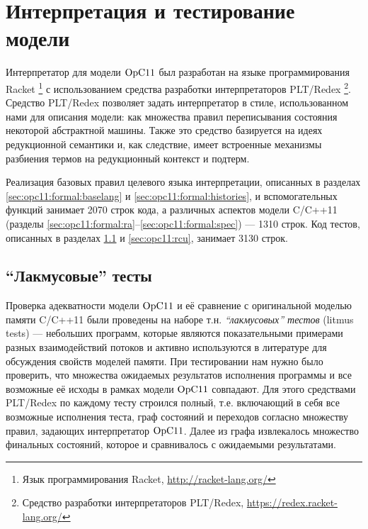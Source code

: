  
\section{Интерпретация и тестирование модели}
\label{sec:opc11:interpreter}

Интерпретатор для модели $\mathrm{OpC11}$ \cite{opCppCode} был разработан на языке программирования Racket%
\footnote{Язык программирования Racket, \url{http://racket-lang.org/}}
с использованием средства разработки интерпретаторов PLT/Redex%
\footnote{Средство разработки интерпретаторов PLT/Redex, \url{https://redex.racket-lang.org/}}.
Средство PLT/Redex позволяет задать интерпретатор в стиле, использованном нами для описания модели:
как множества правил переписывания состояния некоторой абстрактной машины.
Также это средство базируется на идеях редукционной семантики \cite{Klein-al:POPL12,Felleisen-al:BOOK09,Felleisen-Hieb:TCS92}
и, как следствие, имеет встроенные механизмы разбиения термов на редукционный контекст и подтерм.

Реализация базовых правил целевого языка интерпретации, описанных в разделах
\ref{sec:opc11:formal:baselang} и \ref{sec:opc11:formal:histories}, и вспомогательных функций занимает
2070 строк кода, а различных аспектов модели C/C++11
(разделы \ref{sec:opc11:formal:ra}--\ref{sec:opc11:formal:spec})
--- 1310 строк.
Код тестов, описанных в разделах \ref{sec:opc11:litmus} и \ref{sec:opc11:rcu}, занимает 3130 строк.

\subsection{``Лакмусовые'' тесты}
\label{sec:opc11:litmus}
Проверка адекватности модели $\mathrm{OpC11}$ и её сравнение с оригинальной моделью памяти C/C++11 \cite{Batty-al:POPL11}
были проведены на наборе т.н. \emph{``лакмусовых'' тестов} (litmus tests) --- небольших программ, которые
являются показательными примерами разных взаимодействий потоков и активно используются в литературе
\cite{Bornat-al:LACE,Batty-al:POPL11,Lahav-al:POPL16,Maranget-al:tutorial,Turon-al:OOPSLA14}
для обсуждения свойств моделей памяти.
При тестировании нам нужно было проверить, что множества ожидаемых результатов
исполнения программы и все возможные её исходы в рамках модели $\mathrm{OpC11}$ совпадают.
Для этого средствами PLT/Redex по каждому тесту строился полный, т.е. включающий в себя все возможные исполнения теста,
граф состояний и переходов согласно множеству правил, задающих интерпретатор $\mathrm{OpC11}$.
Далее из графа извлекалось множество финальных состояний, которое и сравнивалось с ожидаемыми результатами.

